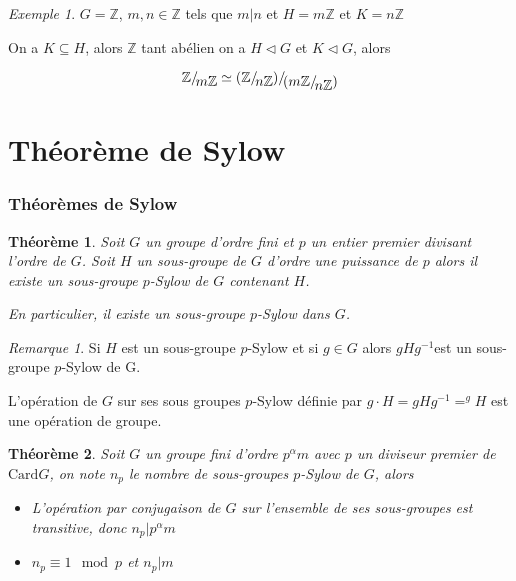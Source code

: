 \documentclass[]{article}
\newtheorem{mythm}{Théorème}
\theoremstyle{remark}
\newtheorem{myrem}{Remarque}
\newtheorem{myexmpl}{Exemple}
\theoremstyle{definition}
\newcommand*{\ClGa}[2]%
{\ensuremath{%
    #1/\!\raisebox{-.65ex}{\ensuremath{#2}}}}
\begin{document}
\begin{myexmpl}
	$G = \mathbb{Z}$, $m, n \in \mathbb{Z}$ tels que $m |n$ et $H = m\mathbb{Z}$ et $K = n \mathbb{Z}$
	
	On a $K \subseteq H$, alors $\mathbb{Z}$ tant abélien on a $H\vartriangleleft G$ et $K \vartriangleleft G$, alors
	
	$$\ClGa{\mathbb{Z}}{m\mathbb{Z}} \simeq (\ClGa{\ClGa{\mathbb{Z}}{n\mathbb{Z}})}{(\ClGa{m\mathbb{Z}}{n\mathbb{Z}})}$$
\end{myexmpl}

\part{Théorème de Sylow}

\section{Théorèmes de Sylow}

\begin{mythm}
	Soit $G$ un groupe d'ordre fini et $p$ un entier premier divisant l'ordre de $G$. Soit $H$ un sous-groupe de $G$ d'ordre une puissance de $p$ alors il existe un sous-groupe $p$-Sylow de $G$ contenant $H$.
	
	En particulier, il existe un sous-groupe $p$-Sylow dans $G$.
\end{mythm}

\begin{myrem}
 Si $H$ est un sous-groupe $p$-Sylow et si $g \in G$ alors $gHg^{-1}$est un sous-groupe $p$-Sylow de G.
 
 L'opération de $G$ sur ses sous groupes $p$-Sylow définie par $g \cdot H = gHg^{-1} = ^gH$ est une opération de groupe.
\end{myrem}

\begin{mythm}
	Soit $G$ un groupe fini d'ordre $p^\alpha m$ avec $p$ un diviseur premier de $\text{Card} G$, on note $n_p$ le nombre de sous-groupes $p$-Sylow de $G$, alors
	
	\begin{itemize}
		\item L'opération par conjugaison de $G$ sur l'ensemble de ses sous-groupes est transitive, donc $n_p | p^\alpha m$
		
		\item $n_p \equiv 1 \mod p$ et $n_p | m$
	\end{itemize}
\end{mythm}
\end{document}
